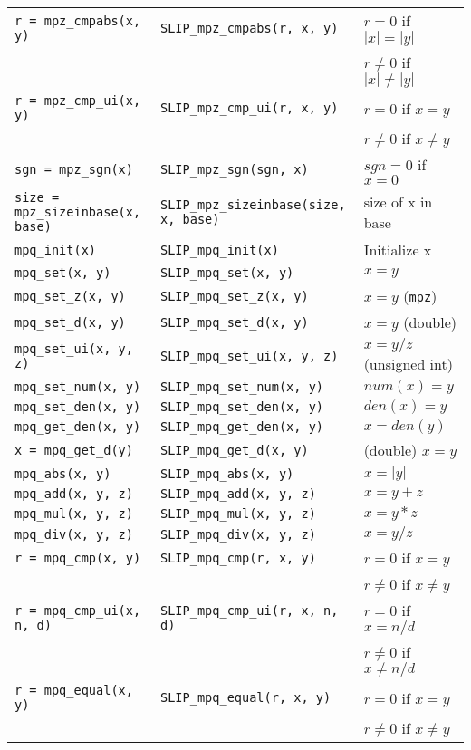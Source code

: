 \documentclass[12pt]{article}
\theoremstyle{definition}
\begin{document}
{\begin{center}
\begin{tabular}{|l|l|l|}
\verb|r = mpz_cmpabs(x, y)|
    & \verb|SLIP_mpz_cmpabs(r, x, y)|
    & $r = 0$ if $|x|=|y|$\\&&  $r\neq 0$  if $|x|\neq |y|$\\ \hline
\verb|r = mpz_cmp_ui(x, y)|
    & \verb|SLIP_mpz_cmp_ui(r, x, y)|
    & $r = 0$ if $x=y$\\&&  $r\neq 0$  if $x\neq y$ \\ \hline
\verb|sgn = mpz_sgn(x)|
    & \verb|SLIP_mpz_sgn(sgn, x)|
    & $sgn = 0$ if $x = 0$ \\ \hline
\verb|size = mpz_sizeinbase(x, base)|
    & \verb|SLIP_mpz_sizeinbase(size, x, base)|
    & size of x in base \\ \hline
\verb|mpq_init(x)|
    & \verb|SLIP_mpq_init(x)|
    & Initialize x \\ \hline
\verb|mpq_set(x, y)|
    & \verb|SLIP_mpq_set(x, y)|
    & $x = y$ \\ \hline
\verb|mpq_set_z(x, y)|
    & \verb|SLIP_mpq_set_z(x, y)|
    & $x = y$ (\verb|mpz|) \\ \hline
\verb|mpq_set_d(x, y)|
    & \verb|SLIP_mpq_set_d(x, y)|
    & $x=y$ (double) \\ \hline
\verb|mpq_set_ui(x, y, z)|
    & \verb|SLIP_mpq_set_ui(x, y, z)|
    & $x = y/z$ (unsigned int) \\ \hline
\verb|mpq_set_num(x, y)|
    & \verb|SLIP_mpq_set_num(x, y)|
    & $num(x) = y$ \\ \hline
\verb|mpq_set_den(x, y)|
    & \verb|SLIP_mpq_set_den(x, y)|
    & $den(x) = y$ \\ \hline
\verb|mpq_get_den(x, y)|
    & \verb|SLIP_mpq_get_den(x, y)|
    & $x = den(y)$ \\ \hline
\verb|x = mpq_get_d(y)|
    & \verb|SLIP_mpq_get_d(x, y)|
    & (double) $x = y$ \\ \hline
\verb|mpq_abs(x, y)|
    & \verb|SLIP_mpq_abs(x, y)|
    & $x = |y|$ \\ \hline
\verb|mpq_add(x, y, z)|
    & \verb|SLIP_mpq_add(x, y, z)|
    & $x = y+z$ \\ \hline
\verb|mpq_mul(x, y, z)|
    & \verb|SLIP_mpq_mul(x, y, z)|
    & $x = y*z$ \\ \hline
\verb|mpq_div(x, y, z)|
    & \verb|SLIP_mpq_div(x, y, z)|
    & $x = y/z$ \\ \hline
\verb|r = mpq_cmp(x, y)|
    & \verb|SLIP_mpq_cmp(r, x, y)|
    & $r = 0$ if $x=y$\\&&  $r\neq 0$ if $x\neq y$ \\ \hline
\verb|r = mpq_cmp_ui(x, n, d)|
    & \verb|SLIP_mpq_cmp_ui(r, x, n, d)|
    & $r = 0$ if $x=n/d$\\&& $r\neq 0$ if $x\neq n/d$ \\ \hline
\verb|r = mpq_equal(x, y)|
    & \verb|SLIP_mpq_equal(r, x, y)|
    & $r = 0$ if $x=y$\\&&  $r\neq 0$ if $x\neq y$ \\ \hline
\end{tabular}
\end{center}
}
\end{document}
